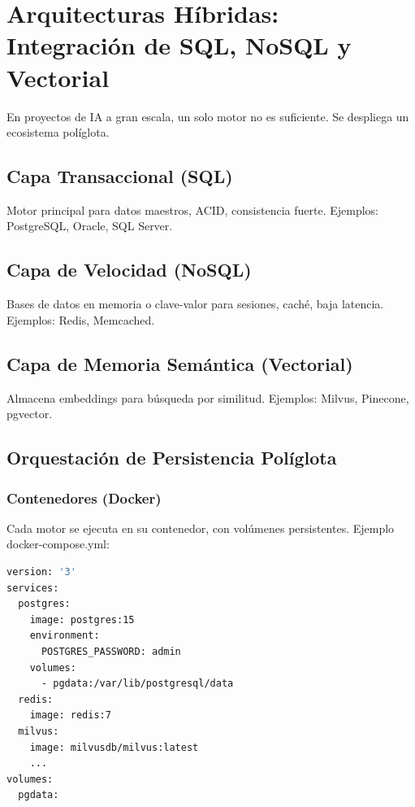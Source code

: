 \documentclass[12pt,a4paper,openany,oneside]{book}
\begin{document}
\chapter{Arquitecturas Híbridas: Integración de SQL, NoSQL y Vectorial}
En proyectos de IA a gran escala, un solo motor no es suficiente. Se despliega un ecosistema políglota.

\section{Capa Transaccional (SQL)}
Motor principal para datos maestros, ACID, consistencia fuerte. Ejemplos: PostgreSQL, Oracle, SQL Server.

\section{Capa de Velocidad (NoSQL)}
Bases de datos en memoria o clave-valor para sesiones, caché, baja latencia. Ejemplos: Redis, Memcached.

\section{Capa de Memoria Semántica (Vectorial)}
Almacena embeddings para búsqueda por similitud. Ejemplos: Milvus, Pinecone, pgvector.

\begin{center}
\end{center}

\section{Orquestación de Persistencia Políglota}
\subsection{Contenedores (Docker)}
Cada motor se ejecuta en su contenedor, con volúmenes persistentes. Ejemplo docker-compose.yml:
\begin{lstlisting}[language=Bash, basicstyle=\ttfamily\small]
version: '3'
services:
  postgres:
    image: postgres:15
    environment:
      POSTGRES_PASSWORD: admin
    volumes:
      - pgdata:/var/lib/postgresql/data
  redis:
    image: redis:7
  milvus:
    image: milvusdb/milvus:latest
    ...
volumes:
  pgdata:
\end{lstlisting}
\end{document}
